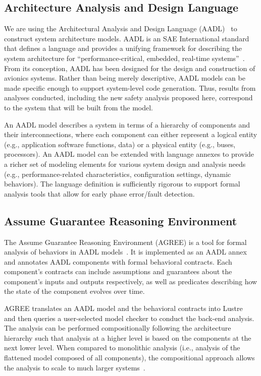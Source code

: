 \subsection{Architecture Analysis and Design Language}
We are using the Architectural Analysis and Design Language (AADL)~\cite{FeilerModelBasedEngineering2012} to construct system architecture models.  AADL is an SAE International standard that defines a language and provides a unifying framework for describing the system architecture for ``performance-critical, embedded, real-time systems''~\cite{AADL_Standard}. From its conception, AADL has been designed for the design and construction of avionics systems.  Rather than being merely descriptive, AADL models can be made specific enough to support system-level code generation.  Thus, results from analyses conducted, including the new safety analysis proposed here, correspond to the system that will be built from the model.  

An AADL model describes a system in terms of a hierarchy of components and their interconnections, where each component can either represent a logical entity (e.g., application software functions, data) or a physical entity (e.g., buses, processors). An AADL model can be extended with language annexes to provide a richer set of modeling elements for various system design and analysis needs (e.g., performance-related characteristics, configuration settings, dynamic behaviors). The language definition is sufficiently rigorous to support formal analysis tools that allow for early phase error/fault detection.

\subsection{Assume Guarantee Reasoning Environment}
The Assume Guarantee Reasoning Environment (AGREE) is a tool for formal analysis of behaviors in AADL models~\cite{NFM2012:CoGaMiWhLaLu}.  It is implemented as an AADL annex and annotates AADL components with formal behavioral contracts. Each component's contracts can include assumptions and guarantees about the component's inputs and outputs respectively, as well as predicates describing how the state of the component evolves over time.

AGREE translates an AADL model and the behavioral contracts into Lustre~\cite{Halbwachs91:IEEE} and then queries a user-selected
model checker to conduct the back-end analysis. The analysis can be performed compositionally following the architecture hierarchy such that analysis at a higher level is based on the components at the next lower level.  When compared to monolithic analysis (i.e., analysis of the flattened model composed of all components), the compositional approach allows the analysis to scale to much larger systems~\cite{QFCS15:backes}. 

